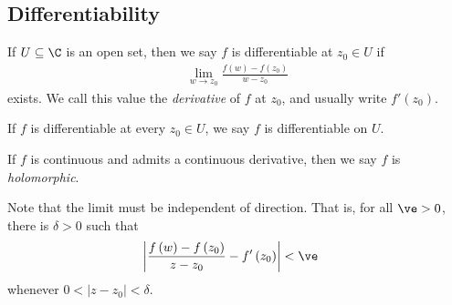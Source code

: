 \documentclass[10pt]{mypackage}
\begin{document}
\subsection{Differentiability}%
\begin{definition}
  If $U\subseteq \C$ is an open set, then we say $f$ is differentiable at $z_0\in U$ if
  \begin{align*}
    \lim_{w\rightarrow z_0} \frac{f\left( w \right)-f\left( z_0 \right)}{w-z_0}
  \end{align*}
  exists. We call this value the \textit{derivative} of $f$ at $z_0$, and usually write $f'\left(z_0\right)$.%

  If $f$ is differentiable at every $z_0\in U$, we say $f$ is differentiable on $U$.%

  If $f$ is continuous and admits a continuous derivative, then we say $f$ is \textit{holomorphic}.
\end{definition}
Note that the limit must be independent of direction. That is, for all $\ve > 0$, there is $\delta > 0$ such that
\begin{align*}
  \left\vert \frac{f\left( w \right)-f\left( z_0 \right)}{z-z_0} - f'\left( z_0 \right) \right\vert &< \ve
\end{align*}
whenever $0 < \left\vert z-z_0 \right\vert < \delta$.%
\end{document}
